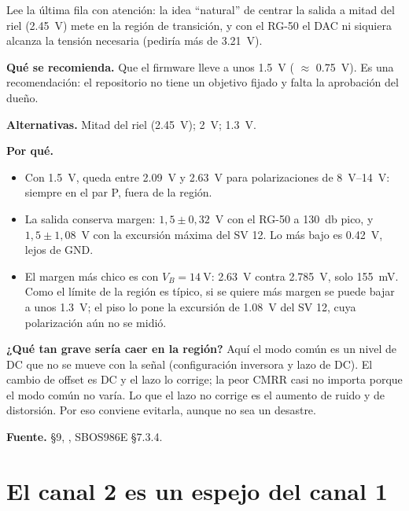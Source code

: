 Lee la última fila con atención: la idea ``natural'' de centrar la salida a mitad del riel
(\SI{2.45}{\volt}) mete  en la región de transición, y con el RG-50 el DAC ni siquiera alcanza la tensión
necesaria (pediría más de \SI{3.21}{\volt}).

\begin{decision}
\textbf{Qué se recomienda.} Que el firmware lleve  a unos \SI{1.5}{\volt} (
$\approx$ \SI{0.75}{\volt}). Es una recomendación: el repositorio no tiene un objetivo fijado y falta la aprobación
del dueño.

\textbf{Alternativas.} Mitad del riel (\SI{2.45}{\volt}); \SI{2}{\volt}; \SI{1.3}{\volt}.

\textbf{Por qué.}
\begin{itemize}
  \item Con \SI{1.5}{\volt},  queda entre \SI{2.09}{\volt} y \SI{2.63}{\volt} para polarizaciones de
        \SIrange{8}{14}{\volt}: siempre en el par P, fuera de la región.
  \item La salida conserva margen: $1{,}5 \pm 0{,}32$~V con el RG-50 a \SI{130}{\decibel} pico, y $1{,}5 \pm 1{,}08$~V
        con la excursión máxima del SV 12. Lo más bajo es \SI{0.42}{\volt}, lejos de GND.
  \item El margen más chico es con $V_B = \SI{14}{\volt}$: \SI{2.63}{\volt} contra \SI{2.785}{\volt}, solo
        \SI{155}{\milli\volt}. Como el límite de la región es típico, si se quiere más margen se puede bajar a unos
        \SI{1.3}{\volt}; el piso lo pone la excursión de \SI{1.08}{\volt} del SV 12, cuya polarización aún no se midió.
\end{itemize}
\textbf{¿Qué tan grave sería caer en la región?} Aquí el modo común es un nivel de DC que no se mueve con la señal
(configuración inversora y lazo de DC). El cambio de offset es DC y el lazo lo corrige; la peor CMRR casi no importa
porque el modo común no varía. Lo que el lazo no corrige es el aumento de ruido y de distorsión. Por eso conviene
evitarla, aunque no sea un desastre.

\textbf{Fuente.}  §9, , SBOS986E §7.3.4.
\end{decision}

\section{El canal 2 es un espejo del canal 1}\label{sec:c03-ch2}

